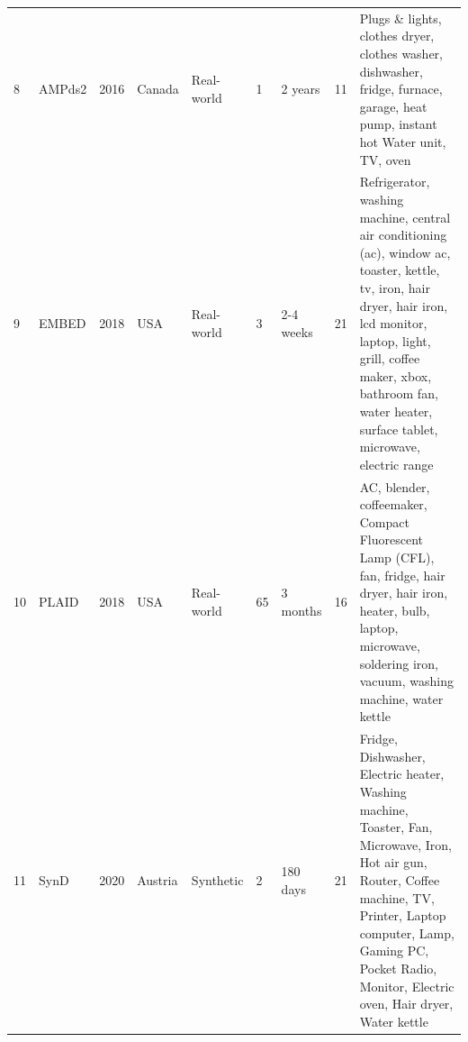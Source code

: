 \begin{table}
{\begin{tabular}{lllp{}lp{}lp{}p{}}
            8           & AMPds2           & 2016          & Canada            & Real-world    & 1                  & 2 years         & 11                     & Plugs \& lights, clothes dryer, clothes washer, dishwasher, fridge, furnace, garage, heat pump, instant hot Water unit, TV, oven                                                                                                                                                                                                                                                                                                                              \\
            9           & EMBED            & 2018          & USA               & Real-world    & 3                  & 2-4 weeks       & 21                     & Refrigerator, washing machine, central air conditioning (ac), window ac, toaster, kettle, tv, iron, hair dryer, hair iron, lcd monitor, laptop, light, grill, coffee maker, xbox, bathroom fan, water heater, surface tablet, microwave, electric range                                                                                                                                                                                                       \\
            10          & PLAID            & 2018          & USA               & Real-world    & 65                 & 3 months        & 16                     & AC, blender, coffeemaker, Compact Fluorescent Lamp (CFL), fan, fridge, hair dryer, hair iron, heater, bulb, laptop, microwave, soldering iron, vacuum, washing machine, water kettle                                                                                                                                                                                                                                                                          \\
            11          & SynD             & 2020          & Austria           & Synthetic     & 2                  & 180 days        & 21                     & Fridge, Dishwasher, Electric heater, Washing machine, Toaster, Fan, Microwave, Iron, Hot air gun, Router, Coffee machine, TV, Printer, Laptop computer, Lamp, Gaming PC, Pocket Radio, Monitor, Electric oven, Hair dryer, Water kettle                                                                                                                                                                                                                       \\

\end{tabular}}
\end{table}
